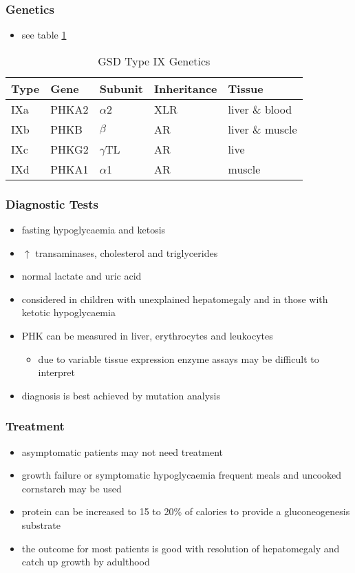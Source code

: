 \documentclass[12pt]{scrartcl}
\begin{document}
\subsubsection{Genetics}
\label{sec:org6293cd0}
\begin{itemize}
\item see table \ref{tab:org1a717a7}
\end{itemize}
\begin{table}[htbp]
\caption{\label{tab:org1a717a7}GSD Type IX Genetics}
\centering
\begin{tabular}{lllll}
Type & Gene & Subunit & Inheritance & Tissue\\
\hline
IXa & PHKA2 & \(\alpha\)2 & XLR & liver \& blood\\
IXb & PHKB & \(\beta\) & AR & liver \& muscle\\
IXc & PHKG2 & \(\gamma\)TL & AR & live\\
IXd & PHKA1 & \(\alpha\)1 & AR & muscle\\
\end{tabular}
\end{table}

\subsubsection{Diagnostic Tests}
\label{sec:org8a2e0c3}
\begin{itemize}
\item fasting hypoglycaemia and ketosis
\item \(\uparrow\) transaminases, cholesterol and triglycerides
\item normal lactate and uric acid
\item considered in children with unexplained hepatomegaly and in those
with ketotic hypoglycaemia
\item PHK can be measured in liver, erythrocytes and leukocytes
\begin{itemize}
\item due to variable tissue expression enzyme assays may be difficult
to interpret
\end{itemize}
\item diagnosis is best achieved by mutation analysis
\end{itemize}
\subsubsection{Treatment}
\label{sec:org2b09ab2}
\begin{itemize}
\item asymptomatic patients may not need treatment
\item growth failure or symptomatic hypoglycaemia frequent meals and
uncooked cornstarch may be used
\item protein can be increased to 15 to 20\% of calories to provide a
gluconeogenesis substrate
\item the outcome for most patients is good with resolution of
hepatomegaly and catch up growth by adulthood
\end{itemize}
\end{document}

